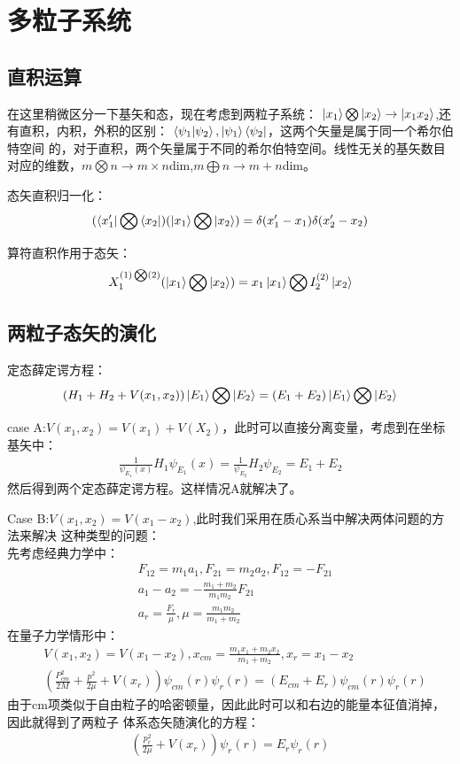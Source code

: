 \documentclass[UTF8]{article}
\numberwithin{equation}{section}
\begin{document}
\section{多粒子系统}
\subsection{直积运算}
在这里稍微区分一下基矢和态，现在考虑到两粒子系统：
$\ket{x_1}\bigotimes\ket{x_2}\rightarrow \ket{x_1x_2}$,还有直积，内积，外积的区别：
$\braket{\psi_1}{\psi_2},\ket{\psi_1}\bra{\psi_2}$，这两个矢量是属于同一个希尔伯特空间
的，对于直积，两个矢量属于不同的希尔伯特空间。线性无关的基矢数目对应的维数，$m\bigotimes
    n\rightarrow m\times n$dim,$ m\bigoplus n \rightarrow m+n $dim。

态矢直积归一化：
\begin{align*}
    (\bra{x_1'}\bigotimes\bra{x_2})(\ket{x_1}\bigotimes \ket{x_2})=\delta(x_1'-x_1)\delta(x_2'-x_2)
\end{align*}

算符直积作用于态矢：
\begin{align*}
    X_1^{(1)\bigotimes(2)}(\ket{x_1}\bigotimes\ket{x_2})=x_1\ket{x_1}\bigotimes I_2^{(2)}\ket{x_2}
\end{align*}
\subsection{两粒子态矢的演化}
定态薛定谔方程：
\begin{align*}
    (H_1+H_2+V(x_1,x_2))\ket{E_1}\bigotimes\ket{E_2}=(E_1+E_2)\ket{E_1}\bigotimes\ket{E_2}
\end{align*}

case A:$V(x_1,x_2)=V(x_1)+V(X_2)$，此时可以直接分离变量，考虑到在坐标基矢中：
\begin{align*}
    \frac{1}{\psi_{E_1}(x)}H_1\psi_{E_1}(x)=\frac{1}{\psi_{E_2}}H_2\psi_{E_2}=E_1+E_2
\end{align*}
然后得到两个定态薛定谔方程。这样情况A就解决了。

Case B:$V(x_1,x_2)=V(x_1-x_2)$,此时我们采用在质心系当中解决两体问题的方法来解决
这种类型的问题：\\
先考虑经典力学中：
\begin{align*}
     & F_{12}=m_1a_1,F_{21}=m_2a_2,F_{12}=-F_{21}         \\
     & a_1-a_2 = -\frac{m_1+m_2}{m_1m_2}F_{21}            \\
     & a_r = \frac{F_r}{\mu},\mu = \frac{m_1m_2}{m_1+m_2}
\end{align*}
在量子力学情形中：
\begin{align*}
     & V(x_1,x_2)=V(x_1-x_2),x_{cm}=\frac{m_1x_1+m_2x_2}{m_1+m_2},x_r=x_1-x_2                               \\
     & (\frac{P_{cm}^2}{2M}+\frac{p^2}{2\mu}+V(x_r))\psi_{cm}(r)\psi_r(r)=(E_{cm}+E_r)\psi_{cm}(r)\psi_r(r)
\end{align*}
由于cm项类似于自由粒子的哈密顿量，因此此时可以和右边的能量本征值消掉，因此就得到了两粒子
体系态矢随演化的方程：
\begin{align*}
    (\frac{p_r^2}{2\mu}+V(x_r))\psi_r(r)=E_r\psi_r(r)
\end{align*}
\end{document}
